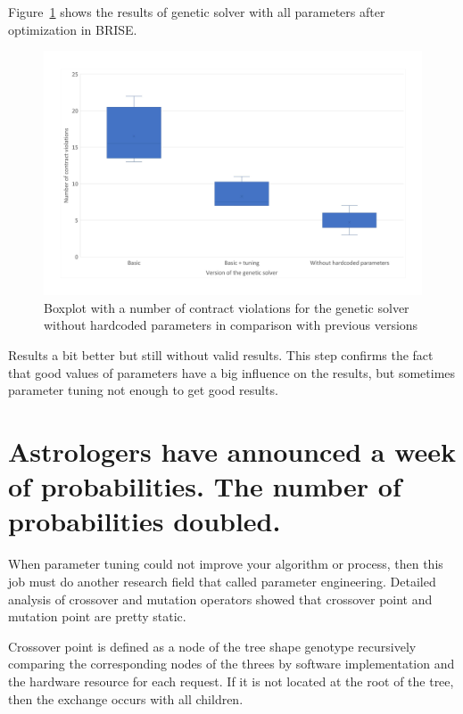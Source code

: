 Figure~\ref{fig:boxplotsolverNoHardcodedTuning} shows the results of genetic solver with all parameters after optimization in BRISE.
\begin{figure}
	\centering
	\includegraphics[width=\textwidth]{images/BoxPlotSolverNoHardcodedTuning.pdf}
	\caption[Boxplot with a number of contract violations for the genetic solver without hardcoded parameters in comparison with previous versions]{Boxplot with a number of contract violations for the genetic solver without hardcoded parameters in comparison with previous versions}
	\label{fig:boxplotsolverNoHardcodedTuning}
\end{figure}
Results a bit better but still without valid results.
This step confirms the fact that good values of parameters have a big influence on the results, but sometimes parameter tuning not enough to get good results. 

\section{Astrologers have announced a week of probabilities. The number of probabilities doubled.}
When parameter tuning could not improve your algorithm or process, then this job must do another research field that called parameter engineering.
Detailed analysis of crossover and mutation operators showed that crossover point and mutation point are pretty static.

Crossover point is defined as a node of the tree shape genotype recursively comparing the corresponding nodes of the threes by software implementation and the hardware resource for each request.
If it is not located at the root of the tree, then the exchange occurs with all children.

